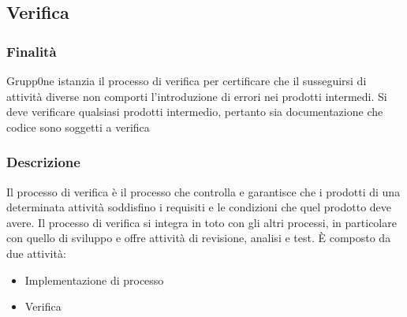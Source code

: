 \documentclass[../norme-di-progetto.tex]{subfiles}
\begin{document}
\subsection{Verifica}
\subsubsection{Finalità}
Grupp0ne istanzia il processo di verifica  per certificare che il susseguirsi di attività diverse non comporti l'introduzione di errori nei prodotti intermedi. Si deve verificare qualsiasi prodotti intermedio, pertanto sia documentazione che codice sono soggetti a verifica 
\subsubsection{Descrizione}
Il processo di verifica è il processo che controlla e garantisce che i prodotti di una determinata attività soddisfino i requisiti e le condizioni che quel prodotto deve avere. Il processo di verifica si integra in toto con gli altri processi, in particolare con quello di sviluppo e offre attività di revisione, analisi e test. È composto da due attività:
\begin{itemize}
	\item Implementazione di processo
	\item Verifica 
\end{itemize} 
\end{document}
